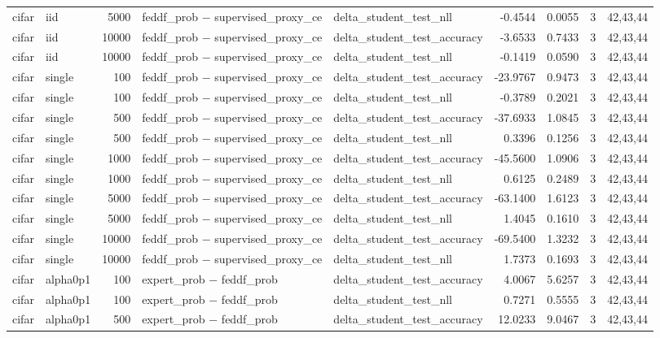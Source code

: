 \begin{tabular}{llrllrrrl}
cifar & iid & 5000 & feddf\_prob − supervised\_proxy\_ce & delta\_student\_test\_nll & -0.4544 & 0.0055 & 3 & 42,43,44 \\
cifar & iid & 10000 & feddf\_prob − supervised\_proxy\_ce & delta\_student\_test\_accuracy & -3.6533 & 0.7433 & 3 & 42,43,44 \\
cifar & iid & 10000 & feddf\_prob − supervised\_proxy\_ce & delta\_student\_test\_nll & -0.1419 & 0.0590 & 3 & 42,43,44 \\
cifar & single & 100 & feddf\_prob − supervised\_proxy\_ce & delta\_student\_test\_accuracy & -23.9767 & 0.9473 & 3 & 42,43,44 \\
cifar & single & 100 & feddf\_prob − supervised\_proxy\_ce & delta\_student\_test\_nll & -0.3789 & 0.2021 & 3 & 42,43,44 \\
cifar & single & 500 & feddf\_prob − supervised\_proxy\_ce & delta\_student\_test\_accuracy & -37.6933 & 1.0845 & 3 & 42,43,44 \\
cifar & single & 500 & feddf\_prob − supervised\_proxy\_ce & delta\_student\_test\_nll & 0.3396 & 0.1256 & 3 & 42,43,44 \\
cifar & single & 1000 & feddf\_prob − supervised\_proxy\_ce & delta\_student\_test\_accuracy & -45.5600 & 1.0906 & 3 & 42,43,44 \\
cifar & single & 1000 & feddf\_prob − supervised\_proxy\_ce & delta\_student\_test\_nll & 0.6125 & 0.2489 & 3 & 42,43,44 \\
cifar & single & 5000 & feddf\_prob − supervised\_proxy\_ce & delta\_student\_test\_accuracy & -63.1400 & 1.6123 & 3 & 42,43,44 \\
cifar & single & 5000 & feddf\_prob − supervised\_proxy\_ce & delta\_student\_test\_nll & 1.4045 & 0.1610 & 3 & 42,43,44 \\
cifar & single & 10000 & feddf\_prob − supervised\_proxy\_ce & delta\_student\_test\_accuracy & -69.5400 & 1.3232 & 3 & 42,43,44 \\
cifar & single & 10000 & feddf\_prob − supervised\_proxy\_ce & delta\_student\_test\_nll & 1.7373 & 0.1693 & 3 & 42,43,44 \\
cifar & alpha0p1 & 100 & expert\_prob − feddf\_prob & delta\_student\_test\_accuracy & 4.0067 & 5.6257 & 3 & 42,43,44 \\
cifar & alpha0p1 & 100 & expert\_prob − feddf\_prob & delta\_student\_test\_nll & 0.7271 & 0.5555 & 3 & 42,43,44 \\
cifar & alpha0p1 & 500 & expert\_prob − feddf\_prob & delta\_student\_test\_accuracy & 12.0233 & 9.0467 & 3 & 42,43,44 \\

\end{tabular}
